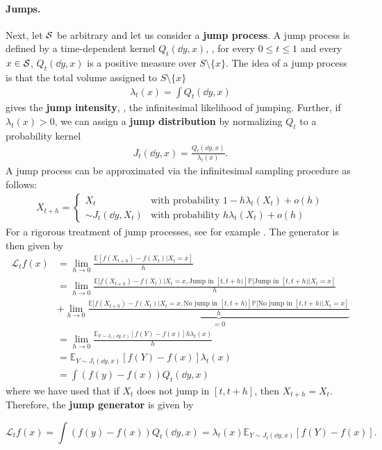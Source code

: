 \documentclass{fairmeta}
\newcommand{\highlight}[1]{{\color{metablue} \textbf{#1}}}
\numberwithin{equation}{section}
\begin{document}
\paragraph{Jumps.} Next, let ${\mathcal{S}}$ be arbitrary and let us consider a \highlight{jump process}. A jump process is defined by a time-dependent kernel $Q_t(\dd y,x)$, \ie, for every $0\leq t \leq 1$ and every $x\in {\mathcal{S}}$, $Q_t(\dd y,x)$ is a positive measure over $S\setminus\{x\}$. The idea of a jump process is that the total volume assigned to $S\setminus\{x\}$
\begin{align}
    \lambda_t(x) = \int Q_t(\dd y,x)
\end{align}
gives the \highlight{jump intensity}, \ie, the infinitesimal likelihood of jumping. Further, if $\lambda_t(x)>0$, we can assign a \highlight{jump distribution} by normalizing $Q_t$ to a probability kernel
\begin{align}
\label{eq:jump_kernel_decomposition}
    J_t(\dd y,x) = \frac{Q_t(\dd y,x)}{\lambda_t(x)}.
\end{align}
A jump process can be approximated via the infinitesimal sampling procedure as follows:
\begin{align}
    X_{t+h} = 
\begin{cases}
        X_t & \text{with probability }1-h\lambda_t(X_t)+o(h) \\
        \sim J_t(\dd y,X_t) & \text{with probability }h\lambda_t(X_t)+o(h)
\end{cases}
\end{align}
For a rigorous treatment of jump processes, see for example \citep{davis1984piecewise}. The generator is then given by
\begin{align}
\mathcal{L}_tf(x)&=\lim\limits_{h\to 0}\frac{\mathbb{E}[f(X_{t+h})-f(X_t)|X_t=x]}{h}\\
&=\lim\limits_{h\to 0}\frac{\mathbb{E}[f(X_{t+h})-f(X_t)|X_t=x,\text{Jump in }[t,t+h)]\mathbb{P}[\text{Jump in }[t,t+h)|X_t=x]}{h}\\
&+\lim\limits_{h\to 0}\underbrace{\frac{\mathbb{E}[f(X_{t+h})-f(X_t)|X_t=x,\text{No jump in }[t,t+h)]\mathbb{P}[\text{No jump in }[t,t+h)|X_t=x]}{h}}_{=0}\\
&=\lim\limits_{h\to 0}\frac{\mathbb{E}_{Y\sim J_t(\dd y,x)}\left[f(Y)-f(x)\right]h\lambda_t(x)}{h}\\
&=\mathbb{E}_{Y\sim J_t(\dd y,x)}\left[f(Y)-f(x)\right]\lambda_t(x)\\
&=\int (f(y)-f(x))Q_t(\dd y,x)
\end{align}
where we have used that if $X_t$ does not jump in $[t,t+h]$, then $X_{t+h}=X_t$. Therefore, the \highlight{jump generator} is given by
\begin{myframe}
\begin{equation}
\label{eq:jump_generator}
  \mathcal{L}_t f(x) =\int (f(y)-f(x))Q_t(\dd y,x)=\lambda_t(x)\mathbb{E}_{Y\sim J_t(\dd y,x)}[f(Y)-f(x)].
\end{equation}
\end{myframe}
\end{document}
